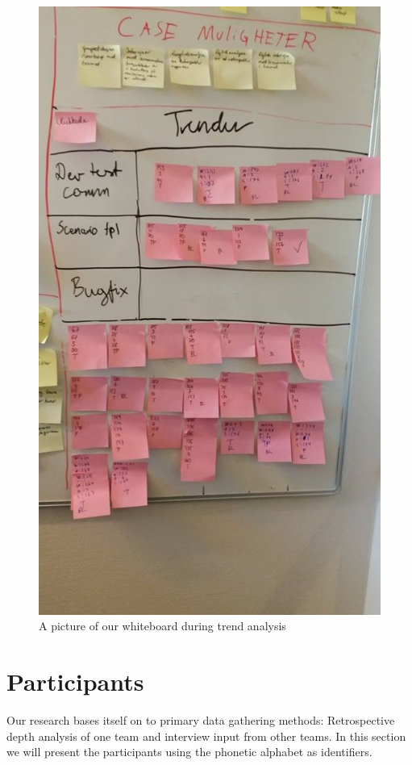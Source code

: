 \begin{figure}
	\centering
	\includegraphics[width=\textwidth, keepaspectratio]{figures/analysis-trends.png}
	\caption{A picture of our whiteboard during trend analysis}
	\label{fig:Analysis-trends}
\end{figure}


\section{Participants}
Our research bases itself on to primary data gathering methods: Retrospective depth analysis of one team and interview input from other teams. In this section we will present the participants using the phonetic alphabet as identifiers. 

